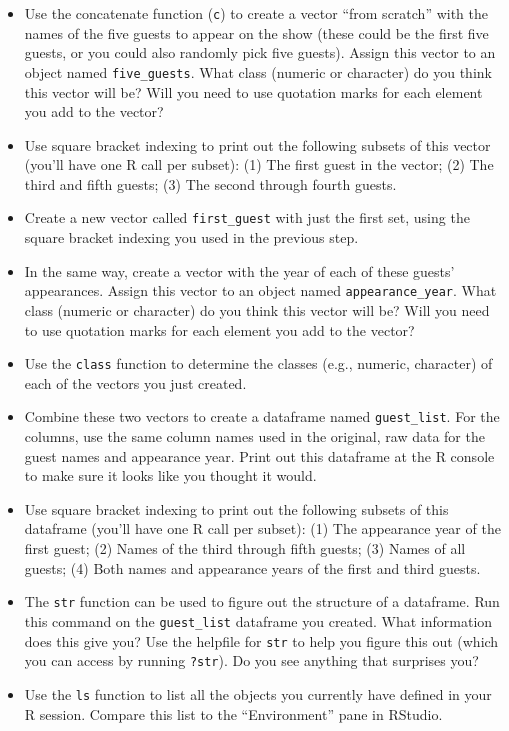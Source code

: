 \documentclass[]{book}
\providecommand{\tightlist}{%
  \setlength{\itemsep}{0pt}\setlength{\parskip}{0pt}}
\theoremstyle{definition}
\theoremstyle{definition}
\theoremstyle{definition}
\theoremstyle{remark}
\begin{document}
\begin{itemize}
\tightlist
\item
  Use the concatenate function (\texttt{c}) to create a vector ``from
  scratch'' with the names of the five guests to appear on the show
  (these could be the first five guests, or you could also randomly pick
  five guests). Assign this vector to an object named
  \texttt{five\_guests}. What class (numeric or character) do you think
  this vector will be? Will you need to use quotation marks for each
  element you add to the vector?
\item
  Use square bracket indexing to print out the following subsets of this
  vector (you'll have one R call per subset): (1) The first guest in the
  vector; (2) The third and fifth guests; (3) The second through fourth
  guests.
\item
  Create a new vector called \texttt{first\_guest} with just the first
  set, using the square bracket indexing you used in the previous step.
\item
  In the same way, create a vector with the year of each of these
  guests' appearances. Assign this vector to an object named
  \texttt{appearance\_year}. What class (numeric or character) do you
  think this vector will be? Will you need to use quotation marks for
  each element you add to the vector?
\item
  Use the \texttt{class} function to determine the classes (e.g.,
  numeric, character) of each of the vectors you just created.
\item
  Combine these two vectors to create a dataframe named
  \texttt{guest\_list}. For the columns, use the same column names used
  in the original, raw data for the guest names and appearance year.
  Print out this dataframe at the R console to make sure it looks like
  you thought it would.
\item
  Use square bracket indexing to print out the following subsets of this
  dataframe (you'll have one R call per subset): (1) The appearance year
  of the first guest; (2) Names of the third through fifth guests; (3)
  Names of all guests; (4) Both names and appearance years of the first
  and third guests.
\item
  The \texttt{str} function can be used to figure out the structure of a
  dataframe. Run this command on the \texttt{guest\_list} dataframe you
  created. What information does this give you? Use the helpfile for
  \texttt{str} to help you figure this out (which you can access by
  running \texttt{?str}). Do you see anything that surprises you?
\item
  Use the \texttt{ls} function to list all the objects you currently
  have defined in your R session. Compare this list to the
  ``Environment'' pane in RStudio.
\end{itemize}
\end{document}
